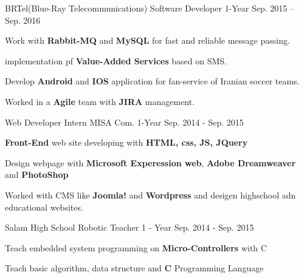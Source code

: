 \begin{cventries}
  \cventry
    {BRTel(Blue-Ray Telecommunications)} %
    {Software Developer} %
    {1-Year} %
    {Sep. 2015 -- Sep. 2016} %
    {
      \begin{cvitems} %
        \item {Work with \textbf{Rabbit-MQ} and \textbf{MySQL} for fast and reliable message passing.}
        \item {implementation pf \textbf{Value-Added Services} based on SMS.}
        \item {Develop \textbf{Android} and \textbf{IOS} application for fan-service of Iranian soccer teams.}
        \item {Worked in a \textbf{Agile} team with \textbf{JIRA} management.}
      \end{cvitems}
    }

  \cventry
    {Web Developer Intern} %
    {MISA Com.} %
    {1-Year} %
    {Sep. 2014 - Sep. 2015} %
    {
      \begin{cvitems} %
        \item {\textbf{Front-End} web site developing with \textbf{HTML, css, JS, JQuery}}
        \item {Design webpage with \textbf{Microsoft Experession web}, \textbf{Adobe Dreamweaver} and \textbf{PhotoShop}}
        \item {Worked with CMS like \textbf{Joomla!} and \textbf{Wordpress} and desigen highschool adn educational websites.}
      \end{cvitems}
    }
    
  \cventry
    {Salam High School} %
    {Robotic Teacher} %
    {1 - Year} %
    {Sep. 2014 - Sep. 2015} %
    {
      \begin{cvitems} %
        \item {Teach embedded system programming on \textbf{Micro-Controllers} with C}
        \item {Teach basic algorithm, data structure and \textbf{C} Programming Language}
      \end{cvitems}
    }


\end{cventries}
